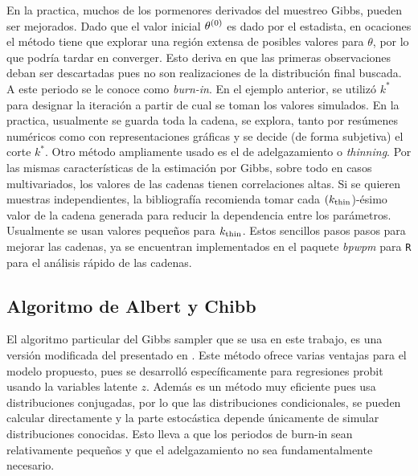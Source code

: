 \documentclass[../Main/Main.tex]{subfiles}
\begin{document}
En la practica, muchos de los pormenores derivados del muestreo Gibbs, pueden ser mejorados. Dado que el valor inicial $\theta^{(0)}$ es dado por el estadista, en ocaciones el método tiene que explorar una región extensa de posibles valores para $\theta$, por lo que podría tardar en converger. Esto deriva en que las primeras observaciones deban ser descartadas pues no son realizaciones de la distribución final buscada. A este periodo se le conoce como \textit{burn-in}. En el ejemplo anterior, se utilizó $k^*$ para designar la iteración a partir de cual se toman los valores simulados. En la practica, usualmente se guarda toda la cadena, se explora, tanto por resúmenes numéricos como con representaciones gráficas y se decide (de forma subjetiva) el corte  $k^*$. Otro método ampliamente usado es el de adelgazamiento o \textit{thinning}. Por las mismas características de la estimación por Gibbs, sobre todo en casos multivariados, los valores de las cadenas tienen correlaciones altas. Si se quieren muestras independientes, la bibliografía recomienda tomar cada $(k_{\text{thin}}$)-ésimo valor de la cadena generada para reducir la dependencia entre los parámetros. Usualmente se usan valores pequeños para $k_{\text{thin}}$.  Estos sencillos pasos pasos para mejorar las cadenas, ya se encuentran implementados en el paquete \textit{bpwpm} para \verb|R| para el análisis rápido de las cadenas.

\subsection{Algoritmo de Albert y Chibb}
El algoritmo particular del Gibbs sampler que se usa en este trabajo, es una versión modificada del presentado en \autocite{albert1993bayesian}. Este método ofrece varias ventajas para el modelo propuesto, pues se desarrolló específicamente para regresiones probit usando la variables latente $z$. Además es un método muy eficiente pues usa distribuciones conjugadas, por lo que las distribuciones condicionales, se pueden calcular directamente y la parte estocástica depende únicamente de simular distribuciones conocidas. Esto lleva a que los periodos de burn-in sean relativamente pequeños y que el adelgazamiento no sea fundamentalmente necesario.
\end{document}
